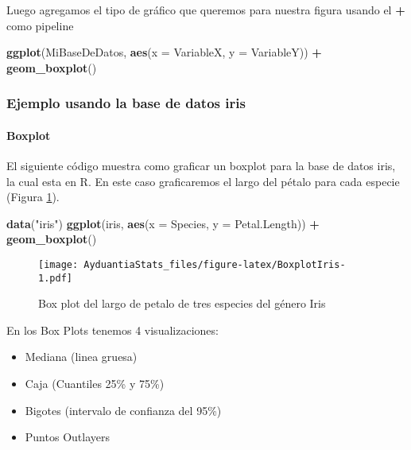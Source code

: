 \documentclass[]{book}
\newenvironment{Shaded}{\begin{snugshade}}{\end{snugshade}}
\newcommand{\KeywordTok}[1]{\textcolor[rgb]{0.13,0.29,0.53}{\textbf{#1}}}
\newcommand{\DataTypeTok}[1]{\textcolor[rgb]{0.13,0.29,0.53}{#1}}
\newcommand{\StringTok}[1]{\textcolor[rgb]{0.31,0.60,0.02}{#1}}
\newcommand{\OperatorTok}[1]{\textcolor[rgb]{0.81,0.36,0.00}{\textbf{#1}}}
\newcommand{\NormalTok}[1]{#1}
\providecommand{\tightlist}{%
  \setlength{\itemsep}{0pt}\setlength{\parskip}{0pt}}
\let\oldparagraph\paragraph
\renewcommand{\paragraph}[1]{\oldparagraph{#1}\mbox{}}
\begin{document}
Luego agregamos el tipo de gráfico que queremos para nuestra figura
usando el \textbf{+} como pipeline

\begin{Shaded}
\begin{Highlighting}[]
\KeywordTok{ggplot}\NormalTok{(MiBaseDeDatos, }\KeywordTok{aes}\NormalTok{(}\DataTypeTok{x =}\NormalTok{ VariableX, }\DataTypeTok{y =}\NormalTok{ VariableY)) }\OperatorTok{+}\StringTok{ }\KeywordTok{geom_boxplot}\NormalTok{()}
\end{Highlighting}
\end{Shaded}

\subsubsection{Ejemplo usando la base de datos
iris}\label{ejemplo-usando-la-base-de-datos-iris}

\paragraph{Boxplot}\label{boxplot}

El siguiente código muestra como graficar un boxplot para la base de
datos iris, la cual esta en R. En este caso graficaremos el largo del
pétalo para cada especie (Figura \ref{fig:BoxplotIris}).

\begin{Shaded}
\begin{Highlighting}[]
\KeywordTok{data}\NormalTok{(}\StringTok{"iris"}\NormalTok{)}
\KeywordTok{ggplot}\NormalTok{(iris, }\KeywordTok{aes}\NormalTok{(}\DataTypeTok{x =}\NormalTok{ Species, }\DataTypeTok{y =}\NormalTok{ Petal.Length)) }\OperatorTok{+}\StringTok{ }\KeywordTok{geom_boxplot}\NormalTok{()}
\end{Highlighting}
\end{Shaded}

\begin{figure}
\centering
\texttt{[image: AyduantiaStats\_files/figure-latex/BoxplotIris-1.pdf]}
\caption{\label{fig:BoxplotIris}Box plot del largo de petalo de tres
especies del género Iris}
\end{figure}

En los Box Plots tenemos 4 visualizaciones:

\begin{itemize}
\tightlist
\item
  Mediana (linea gruesa)
\item
  Caja (Cuantiles 25\% y 75\%)
\item
  Bigotes (intervalo de confianza del 95\%)
\item
  Puntos Outlayers
\end{itemize}
\end{document}

